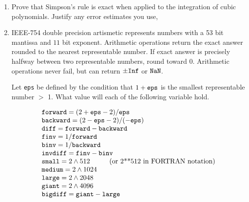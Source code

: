 \begin{large}
\begin{enumerate}
\item Prove that Simpson's rule is exact when applied to the integration 
of cubic polynomials. Justify any error estimates you use,

%
\item IEEE-754 double precision artismetic represents numbers with a 53 bit
mantissa and $11$ bit exponent. Arithmetic operations return the exact answer
rounded to the nearest representable number. If exact answer is precisely
halfway between two representable numbers, round toward $0$. Arithmetic 
operations never fail, but can 
return $ \pm \mbox{\tt Inf} $ or $\mbox{\tt NaN}$.
      
      Let {\tt eps} be defined by the condition that $1 + \mbox{\tt eps}$ is the 
smallest representable number $>$ 1. What value will each of the following
variable hold.

$$\begin{array}{l}
 \mbox{\tt forward}=(2+\mbox{\tt eps}-2)/\mbox{\tt eps} \\
 \mbox{\tt backward}=(2-\mbox{\tt eps}-2)/(-\mbox{\tt eps}) \\
 \mbox{\tt diff}=\mbox{\tt forward}-\mbox{\tt backward} \\
 \mbox{\tt finv}=1/\mbox{\tt forward} \\
 \mbox{\tt binv}=1/\mbox{\tt backward} \\
 \mbox{\tt invdiff}=\mbox{\tt finv}-\mbox{\tt binv} \\
 \mbox{\tt small}=\mbox{$2 \wedge 512$ \hspace{.3in} (or 2**512
in FORTRAN notation)} \\
 \mbox{\tt medium}=\mbox{$2 \wedge 1024$} \\
 \mbox{\tt large}=\mbox{$2 \wedge 2048$} \\
 \mbox{\tt giant}=\mbox{$2 \wedge 4096$} \\
 \mbox{\tt bigdiff}=\mbox{\tt giant}-\mbox{\tt large}
\end{array}
$$



\end{enumerate}
\end{large}
